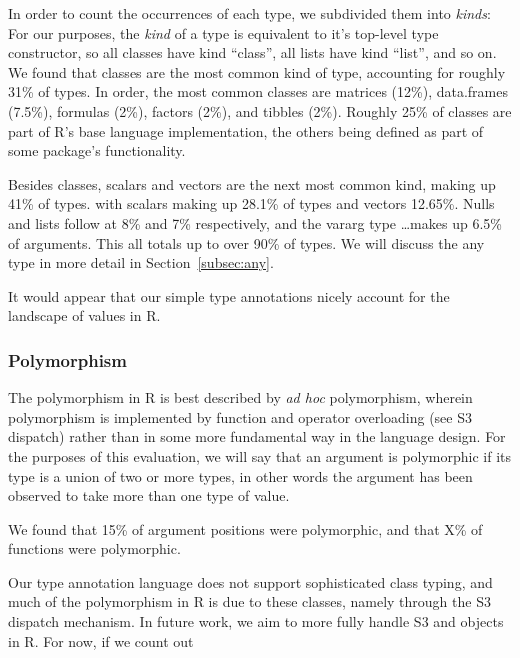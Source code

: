 \documentclass[acmsmall,review,anonymous]{acmart}\settopmatter{printfolios=true,printccs=false,printacmref=false}
\begin{document}

In order to count the occurrences of each type, we subdivided them into {\it kinds}: 
For our purposes, the {\it kind} of a type is equivalent to it's top-level type constructor, so all classes have kind ``class'', all lists have kind ``list'', and so on.
We found that classes are the most common kind of type, accounting for roughly 31\% of types.
In order, the most common classes are matrices (12\%), data.frames (7.5\%), formulas (2\%), factors (2\%), and tibbles (2\%).
Roughly 25\% of classes are part of R's base language implementation, the others being defined as part of some package's functionality.

Besides classes, scalars and vectors are the next most common kind, making up 41\% of types. with scalars making up 28.1\% of types and vectors 12.65\%.
Nulls and lists follow at 8\% and 7\% respectively, and the vararg type \ldots makes up 6.5\% of arguments.
This all totals up to over 90\% of types.
We will discuss the any type in more detail in Section~\ref{subsec:any}.

It would appear that our simple type annotations nicely account for the landscape of values in R.

%
%
\subsubsection{Polymorphism}

The polymorphism in R is best described by {\it ad hoc} polymorphism, wherein polymorphism is implemented by function and operator overloading (see S3 dispatch) rather than in some more fundamental way in the language design.
For the purposes of this evaluation, we will say that an argument is polymorphic if its type is a union of two or more types, in other words the argument has been observed to take more than one type of value.

We found that 15\% of argument positions were polymorphic, and that X\% of functions were polymorphic.

Our type annotation language does not support sophisticated class typing, and much of the polymorphism in R is due to these classes, namely through the S3 dispatch mechanism. 
In future work, we aim to more fully handle S3 and objects in R.
For now, if we count out 
\end{document}
